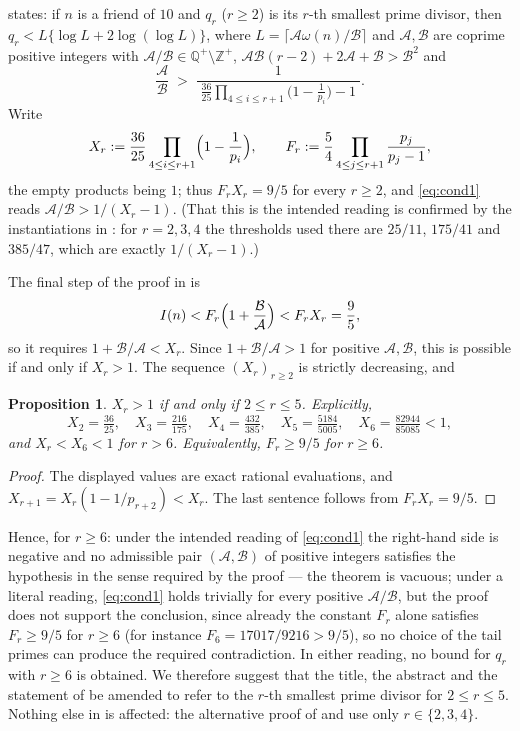 \documentclass[11pt,a4paper]{article}
\theoremstyle{plain}
\newtheorem{proposition}[theorem]{Proposition}
\theoremstyle{definition}
\newcommand{\ZZ}{\mathbb{Z}}
\newcommand{\QQ}{\mathbb{Q}}
\newcommand{\Iab}{I}
\begin{document}
\cite[Theorem 1.2]{M10} states: if $n$ is a friend of $10$ and $q_{r}$ ($r\ge 2$) is
its $r$-th smallest prime divisor, then $q_{r}<L\{\log L+2\log(\log L)\}$, where
$L=\lceil\mathcal{A}\omega(n)/\mathcal{B}\rceil$ and $\mathcal{A},\mathcal{B}$ are
coprime positive integers with $\mathcal{A}/\mathcal{B}\in\QQ^{+}\setminus\ZZ^{+}$,
$\mathcal{A}\mathcal{B}(r-2)+2\mathcal{A}+\mathcal{B}>\mathcal{B}^{2}$ and
\begin{equation}\label{eq:cond1}
  \frac{\mathcal{A}}{\mathcal{B}}\;>\;
  \frac{1}{\;\frac{36}{25}\prod_{4\le i\le r+1}\bigl(1-\frac1{p_{i}}\bigr)-1\;} .
\end{equation}
Write
\[
  X_{r}:=\frac{36}{25}\prod_{4\le i\le r+1}\Bigl(1-\frac1{p_{i}}\Bigr),
  \qquad
  F_{r}:=\frac54\prod_{4\le j\le r+1}\frac{p_{j}}{p_{j}-1},
\]
the empty products being $1$; thus $F_{r}X_{r}=9/5$ for every $r\ge 2$, and
\eqref{eq:cond1} reads $\mathcal{A}/\mathcal{B}>1/(X_{r}-1)$. (That this is the
intended reading is confirmed by the instantiations in \cite{M10}: for $r=2,3,4$ the
thresholds used there are $25/11$, $175/41$ and $385/47$, which are exactly
$1/(X_{r}-1)$.)

The final step of the proof in \cite{M10} is
\[
  \Iab(n)<F_{r}\Bigl(1+\frac{\mathcal{B}}{\mathcal{A}}\Bigr)
  <F_{r}X_{r}=\frac95 ,
\]
so it requires $1+\mathcal{B}/\mathcal{A}<X_{r}$. Since
$1+\mathcal{B}/\mathcal{A}>1$ for positive $\mathcal{A},\mathcal{B}$, this is possible
if and only if $X_{r}>1$. The sequence $(X_{r})_{r\ge 2}$ is strictly decreasing, and

\begin{proposition}\label{prop:Xr}
$X_{r}>1$ if and only if $2\le r\le 5$. Explicitly,
\[
  X_{2}=\tfrac{36}{25},\quad X_{3}=\tfrac{216}{175},\quad
  X_{4}=\tfrac{432}{385},\quad X_{5}=\tfrac{5184}{5005},\quad
  X_{6}=\tfrac{82944}{85085}<1 ,
\]
and $X_{r}<X_{6}<1$ for $r>6$. Equivalently, $F_{r}\ge 9/5$ for $r\ge 6$.
\end{proposition}

\begin{proof}
The displayed values are exact rational evaluations, and $X_{r+1}=X_{r}(1-1/p_{r+2})
<X_{r}$. The last sentence follows from $F_{r}X_{r}=9/5$.
\end{proof}

Hence, for $r\ge 6$: under the intended reading of \eqref{eq:cond1} the right-hand
side is negative and no admissible pair $(\mathcal{A},\mathcal{B})$ of positive
integers satisfies the hypothesis in the sense required by the proof --- the theorem
is vacuous; under a literal reading, \eqref{eq:cond1} holds trivially for every
positive $\mathcal{A}/\mathcal{B}$, but the proof does not support the conclusion,
since already the constant $F_{r}$ alone satisfies $F_{r}\ge 9/5$ for $r\ge 6$ (for
instance $F_{6}=17017/9216>9/5$), so no choice of the tail primes can produce the
required contradiction. In either reading, no bound for $q_{r}$ with $r\ge 6$ is
obtained. We therefore suggest that the title, the abstract and the statement of
\cite[Theorem 1.2]{M10} be amended to refer to the $r$-th smallest prime divisor for
$2\le r\le 5$. Nothing else in \cite{M10} is affected: the alternative proof of
\cite[Theorem 1.1]{M10} and \cite[Corollary 1.1]{M10} use only $r\in\{2,3,4\}$.
\end{document}
